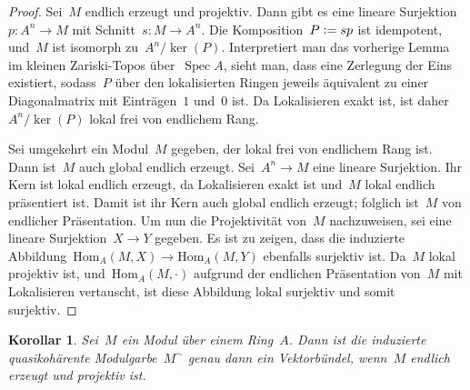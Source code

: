 \documentclass[12pt]{scrartcl}
\theoremstyle{definition}
\theoremstyle{plain}
\newtheorem*{cor}{Korollar}
\theoremstyle{remark}
\newcommand{\defeq}{\vcentcolon=}
\newcommand{\Hom}{\mathrm{Hom}}
\begin{document}
\begin{proof}Sei~$M$ endlich erzeugt und projektiv. Dann gibt es eine lineare
Surjektion~$p : A^n \to M$ mit Schnitt~$s : M \to A^n$. Die Komposition~$P
\defeq sp$ ist idempotent, und~$M$ ist isomorph zu~$A^n/\operatorname{ker}(P)$.
Interpretiert man das vorherige Lemma im kleinen Zariski-Topos
über~$\operatorname{Spec} A$, sieht man, dass eine Zerlegung der Eins
existiert, sodass~$P$ über den lokalisierten Ringen jeweils äquivalent zu einer
Diagonalmatrix mit Einträgen~$1$ und~$0$ ist. Da Lokalisieren exakt ist, ist
daher~$A^n/\operatorname{ker}(P)$ lokal frei von endlichem Rang.

Sei umgekehrt ein Modul~$M$ gegeben, der lokal frei von endlichem Rang ist.
Dann ist~$M$ auch global endlich erzeugt. Sei~$A^n \to M$ eine lineare
Surjektion. Ihr Kern ist lokal endlich erzeugt, da Lokalisieren exakt ist
und~$M$ lokal endlich präsentiert ist. Damit ist ihr Kern auch global endlich
erzeugt; folglich ist~$M$ von endlicher Präsentation. Um nun die Projektivität
von~$M$ nachzuweisen, sei eine lineare Surjektion~$X \to Y$ gegeben. Es ist zu
zeigen, dass die induzierte Abbildung~$\Hom_A(M,X) \to \Hom_A(M,Y)$ ebenfalls
surjektiv ist. Da~$M$ lokal projektiv ist, und~$\Hom_A(M,\cdot)$ aufgrund der
endlichen Präsentation von~$M$ mit Lokalisieren vertauscht, ist diese Abbildung
lokal surjektiv und somit surjektiv.
\end{proof}

\begin{cor}Sei~$M$ ein Modul über einem Ring~$A$. Dann ist die induzierte
quasikohärente Modulgarbe~$M^\sim$ genau dann ein Vektorbündel, wenn~$M$
endlich erzeugt und projektiv ist.\end{cor}

\end{document}
